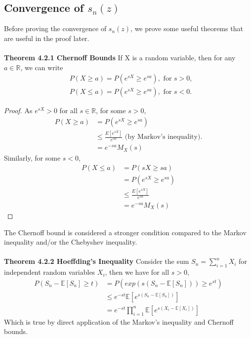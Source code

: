 \documentclass{article}
\begin{document}
\subsection{Convergence of $s_n(z)$}
Before proving the convergence of $s_n(z)$, we prove some useful theorems that are useful in the proof later.\\
\\
\textbf{Theorem 4.2.1 Chernoff Bounds} If X is a random variable, then for any $a \in \mathbb{R}$, we can write
\begin{align*}
    &P(X \geq a) = P(e^{sX} \geq e^{sa}), \text{ for } s > 0, \\
    &P(X \leq a) = P(e^{sX} \geq e^{sa}), \text{ for } s < 0.
\end{align*}
\begin{proof}
    As $e^{sX} > 0$ for all $s\in \mathbb{R}$, for some $s > 0$,
    \begin{align*}
        P(X \geq a) &= P(e^{sX} \geq e^{sa}) \\
                    &\leq \frac{E[e^{sX}]}{e^{sa}} \text{ (by Markov's inequality).}\\
                    &= e^{-sa} M_X(s)
    \end{align*}
    Similarly, for some $s < 0$, 
    \begin{align*}
        P(X \leq a) &= P(sX \geq sa)\\
                    &= P(e^{sX} \geq e^{sa}) \\
                    &\leq \frac{E[e^{sX}]}{e^{sa}}\\
                    &= e^{-sa}M_X({s})
    \end{align*}
\end{proof}
The Chernoff bound is considered a stronger condition compared to the Markov inequality and/or the Chebyshev inequality.\\
\\
\noindent\textbf{Theorem 4.2.2 Hoeffding's Inequality} Consider the sum $S_n = \sum\limits_{i=1}^n X_i$ for independent random variables $X_i$, then we have for all $s > 0$,
\begin{align*}
    P(S_n - \mathbb{E}[S_n] \geq t) &= P(exp(s(S_n - \mathbb{E} [S_n])) \geq e^{st})\\
    &\leq e^{-st} \mathbb{E}\left[ e^{s(S_n - \mathbb{E}[S_n])}\right]\\
    &= e^{-st} \prod\limits_{i=1}^n \mathbb{E}[e^{s(X_i - \mathbb{E}[X_i])}]
\end{align*}
Which is true by direct application of the Markov's inequality and Chernoff bounds.\\
\end{document}
